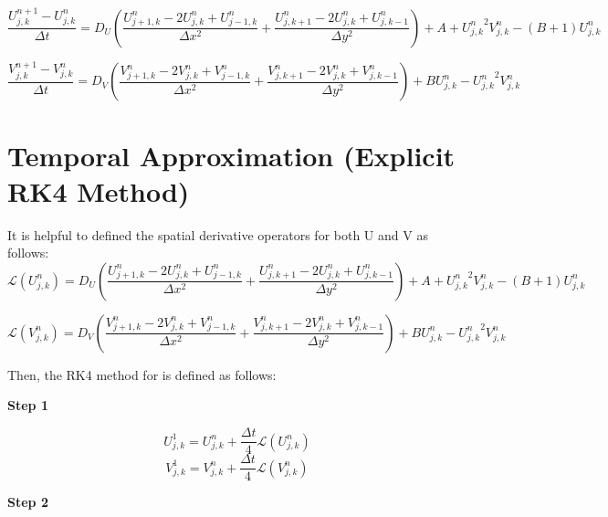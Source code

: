 \documentclass[]{article}
\begin{document}
\begin{equation}
	\frac{U^{n+1}_{j,k} - U^n_{j,k}}{\Delta t} = D_U \left( \frac{U^{n}_{j+1,k} - 2 U^{n}_{j,k} + U^{n}_{j-1,k}}{\Delta x^2} + \frac{U^{n}_{j,k+1} - 2 U^{n}_{j,k} + U^{n}_{j,k-1}}{\Delta y^2}\right) + A + {U^{n}_{j,k}}^2 V^{n}_{j,k} - (B+1) U^{n}_{j,k}
\end{equation}

\begin{equation}
	\frac{V^{n+1}_{j,k} - V^n_{j,k}}{\Delta t} = D_V \left( \frac{V^{n}_{j+1,k} - 2 V^{n}_{j,k} + V^{n}_{j-1,k}}{\Delta x^2} + \frac{V^{n}_{j,k+1} - 2 V^{n}_{j,k} + V^{n}_{j,k-1}}{\Delta y^2}\right) + B U^{n}_{j,k} - {U^{n}_{j,k}}^2 V^{n}_{j,k}
\end{equation}

\section{Temporal Approximation (Explicit RK4 Method)}
It is helpful to defined the spatial derivative operators for both U and V as follows:
\begin{equation}
	\mathcal{L}(U^{n}_{j,k}) = D_U \left( \frac{U^{n}_{j+1,k} - 2 U^{n}_{j,k} + U^{n}_{j-1,k}}{\Delta x^2} + \frac{U^{n}_{j,k+1} - 2 U^{n}_{j,k} + U^{n}_{j,k-1}}{\Delta y^2}\right) + A + {U^{n}_{j,k}}^2 V^{n}_{j,k} - (B+1) U^{n}_{j,k}
\end{equation}

\begin{equation}
	\mathcal{L}(V^{n}_{j,k}) = D_V \left( \frac{V^{n}_{j+1,k} - 2 V^{n}_{j,k} + V^{n}_{j-1,k}}{\Delta x^2} + \frac{V^{n}_{j,k+1} - 2 V^{n}_{j,k} + V^{n}_{j,k-1}}{\Delta y^2}\right) + B U^{n}_{j,k} - {U^{n}_{j,k}}^2 V^{n}_{j,k}
\end{equation}

Then, the RK4 method for is defined as follows:
\begin{center}
	\textbf{Step 1}
\end{center}

\begin{equation}
	U^{1}_{j,k} = U^{n}_{j,k} + \frac{\Delta t}{4} \mathcal{L}(U^{n}_{j,k})
\end{equation}
\begin{equation}
	V^{1}_{j,k} = V^{n}_{j,k} + \frac{\Delta t}{4} \mathcal{L}(V^{n}_{j,k})
\end{equation}

\begin{center}
	\textbf{Step 2}
\end{center}
\end{document}
